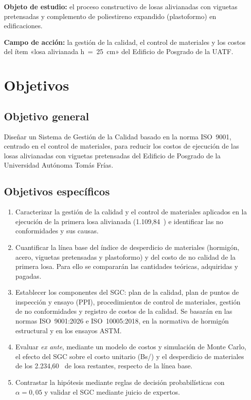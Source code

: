 \textbf{Objeto de estudio:} el proceso constructivo de losas alivianadas con viguetas pretensadas y complemento de poliestireno expandido (plastoformo) en edificaciones.

\textbf{Campo de acción:} la gestión de la calidad, el control de materiales y los costos del ítem «losa alivianada h~=~25~cm» del Edificio de Posgrado de la UATF.

\section{Objetivos}

\subsection{Objetivo general}
Diseñar un Sistema de Gestión de la Calidad basado en la norma ISO~9001, centrado en el control de materiales, para reducir los costos de ejecución de las losas alivianadas con viguetas pretensadas del Edificio de Posgrado de la Universidad Autónoma Tomás Frías.

\subsection{Objetivos específicos}
\begin{enumerate}[label=\textbf{OE\arabic*.}]
  \item Caracterizar la gestión de la calidad y el control de materiales aplicados en la ejecución de la primera losa alivianada (1.109,84~\mdos{}) e identificar las no conformidades y sus causas.
  \item Cuantificar la línea base del índice de desperdicio de materiales (hormigón, acero, viguetas pretensadas y plastoformo) y del costo de no calidad de la primera losa. Para ello se compararán las cantidades teóricas, adquiridas y pagadas.
  \item Establecer los componentes del SGC: plan de la calidad, plan de puntos de inspección y ensayo (PPI), procedimientos de control de materiales, gestión de no conformidades y registro de costos de la calidad. Se basarán en las normas ISO~9001:2026 e ISO~10005:2018, en la normativa de hormigón estructural y en los ensayos ASTM.
  \item Evaluar \emph{ex ante}, mediante un modelo de costos y simulación de Monte Carlo, el efecto del SGC sobre el costo unitario (Bs/\mdos{}) y el desperdicio de materiales de los 2.234,60~\mdos{} de losa restantes, respecto de la línea base.
  \item Contrastar la hipótesis mediante reglas de decisión probabilísticas con $\alpha = 0{,}05$ y validar el SGC mediante juicio de expertos.
\end{enumerate}

